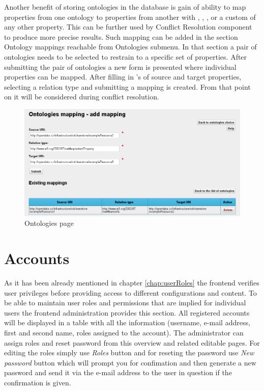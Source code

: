 {Another benefit of storing ontologies in the database is gain of ability to map properties from one ontology to properties from another with , , ,  or a custom  of any other property. This can be further used by Conflict Resolution component to produce more precise results. Such mapping can be added in the section Ontology mappings reachable from Ontologies submenu.
In that section a pair of ontologies needs to be selected to restrain to a specific set of properties. After submitting the pair of ontologies a new form is presented where individual properties can be mapped. After filling in 's of source and target properties, selecting a relation type and submitting a mapping is created. From that point on it will be considered during conflict resolution.

\begin{figure}[!ht]
    \centering
    \includegraphics[width=\textwidth]{images/fe-ontology-mappings.png}
    \caption{Ontologies page}
	\label{fig:feOntologyMappings}
\end{figure}

\section{Accounts}

As it has been already mentioned in chapter \ref{chap:userRoles} the frontend verifies user privileges before providing access to different configurations and content. To be able to maintain user roles and permissions that are implied for individual users the frontend administration provides this section. All registered accounts will be displayed in a table with all the information (username, e-mail address, first and second name, roles assigned to the account). 
The administrator can assign roles and reset password from this overview and related editable pages. For editing the roles simply use \emph{Roles} button and for reseting the password use \emph{New password} button which will prompt you for confimation and then generate a new password and send it via the e-mail address to the user in question if the confirmation is given.

}
